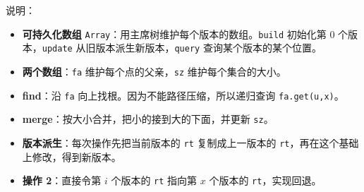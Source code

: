 \par \noindent 说明：
\begin{itemize}
\item \textbf{可持久化数组} \texttt{Array}：用主席树维护每个版本的数组。\texttt{build} 初始化第 0 个版本，\texttt{update} 从旧版本派生新版本，\texttt{query} 查询某个版本的某个位置。
\item \textbf{两个数组}：\texttt{fa} 维护每个点的父亲，\texttt{sz} 维护每个集合的大小。
\item \textbf{find}：沿 \texttt{fa} 向上找根。因为不能路径压缩，所以递归查询 \texttt{fa.get(u,x)}。
\item \textbf{merge}：按大小合并，把小的接到大的下面，并更新 \texttt{sz}。
\item \textbf{版本派生}：每次操作先把当前版本的 \texttt{rt} 复制成上一版本的 \texttt{rt}，再在这个基础上修改，得到新版本。
\item \textbf{操作 2}：直接令第 $i$ 个版本的 \texttt{rt} 指向第 $x$ 个版本的 \texttt{rt}，实现回退。
\end{itemize}